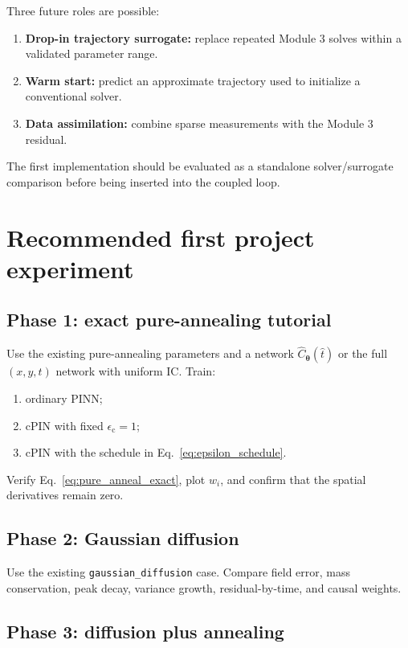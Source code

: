 \documentclass[11pt]{article}
\newcommand{\thetav}{\bm{\theta}}
\newcommand{\epsc}{\epsilon_{\mathrm{c}}}
\begin{document}
Three future roles are possible:
\begin{enumerate}[label=\arabic*.]
    \item \textbf{Drop-in trajectory surrogate:} replace repeated Module 3 solves within a validated parameter range.
    \item \textbf{Warm start:} predict an approximate trajectory used to initialize a conventional solver.
    \item \textbf{Data assimilation:} combine sparse measurements with the Module 3 residual.
\end{enumerate}
The first implementation should be evaluated as a standalone solver/surrogate comparison before being inserted into the coupled loop.

\section{Recommended first project experiment}

\subsection{Phase 1: exact pure-annealing tutorial}

Use the existing pure-annealing parameters and a network $\widehat{C}_{\thetav}(\hat{t})$ or the full $(x,y,t)$ network with uniform IC. Train:
\begin{enumerate}[label=\arabic*.]
    \item ordinary PINN;
    \item cPIN with fixed $\epsc=1$;
    \item cPIN with the schedule in Eq.~\eqref{eq:epsilon_schedule}.
\end{enumerate}
Verify Eq.~\eqref{eq:pure_anneal_exact}, plot $w_i$, and confirm that the spatial derivatives remain zero.

\subsection{Phase 2: Gaussian diffusion}

Use the existing \texttt{gaussian\_diffusion} case. Compare field error, mass conservation, peak decay, variance growth, residual-by-time, and causal weights.

\subsection{Phase 3: diffusion plus annealing}
\end{document}

